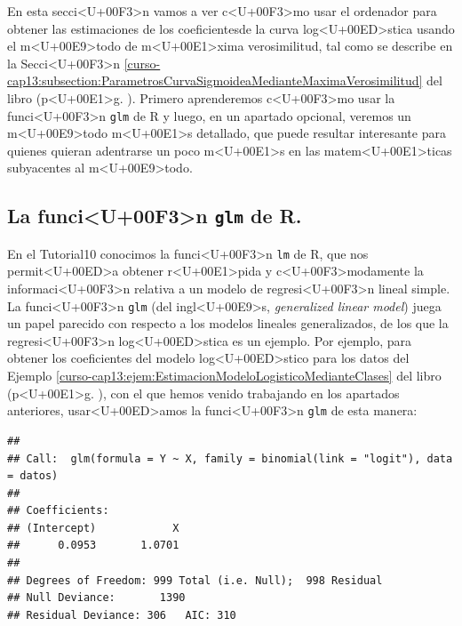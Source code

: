 \documentclass[10pt,a4paper]{article}
\begin{document}
En esta secci<U+00F3>n vamos a ver c<U+00F3>mo usar el ordenador para obtener las estimaciones de los coeficientesde la curva log<U+00ED>stica usando el m<U+00E9>todo de m<U+00E1>xima verosimilitud, tal como se describe en la Secci<U+00F3>n \ref{curso-cap13:subsection:ParametrosCurvaSigmoideaMedianteMaximaVerosimilitud} del libro (p<U+00E1>g. \pageref{curso-cap13:subsection:ParametrosCurvaSigmoideaMedianteMaximaVerosimilitud}). Primero aprenderemos c<U+00F3>mo usar la funci<U+00F3>n {\tt glm} de R y luego, en un apartado opcional, veremos un m<U+00E9>todo m<U+00E1>s detallado, que puede resultar interesante para quienes quieran adentrarse un poco m<U+00E1>s en las matem<U+00E1>ticas subyacentes al m<U+00E9>todo.

\subsection{La funci<U+00F3>n {\tt glm} de R.}
\label{tut13:subsec:funcionGlm}

En el Tutorial10 conocimos la funci<U+00F3>n {\tt lm} de R, que nos permit<U+00ED>a obtener r<U+00E1>pida y c<U+00F3>modamente la informaci<U+00F3>n relativa a  un modelo de regresi<U+00F3>n lineal simple. La funci<U+00F3>n {\tt glm} (del ingl<U+00E9>s, {\em generalized linear model}) juega un papel parecido con respecto a los modelos lineales generalizados, de los que la regresi<U+00F3>n log<U+00ED>stica es un ejemplo. Por ejemplo, para obtener los coeficientes del modelo log<U+00ED>stico para los datos del Ejemplo \ref{curso-cap13:ejem:EstimacionModeloLogisticoMedianteClases} del libro (p<U+00E1>g. \pageref{curso-cap13:ejem:EstimacionModeloLogisticoMedianteClases}), con el que hemos venido trabajando en los apartados anteriores, usar<U+00ED>amos la funci<U+00F3>n {\tt glm} de esta manera:

\begin{knitrout}
\color{fgcolor}\begin{kframe}
\begin{alltt}
 \hlkwb{=}  \hlopt{~}   \hlstd{=} \hlstd{(} \hlstd{=} \hlstd{),}  
\end{alltt}
\begin{verbatim}
## 
## Call:  glm(formula = Y ~ X, family = binomial(link = "logit"), data = datos)
## 
## Coefficients:
## (Intercept)            X  
##      0.0953       1.0701  
## 
## Degrees of Freedom: 999 Total (i.e. Null);  998 Residual
## Null Deviance:	    1390 
## Residual Deviance: 306 	AIC: 310
\end{verbatim}
\end{kframe}
\end{knitrout}
\end{document}
